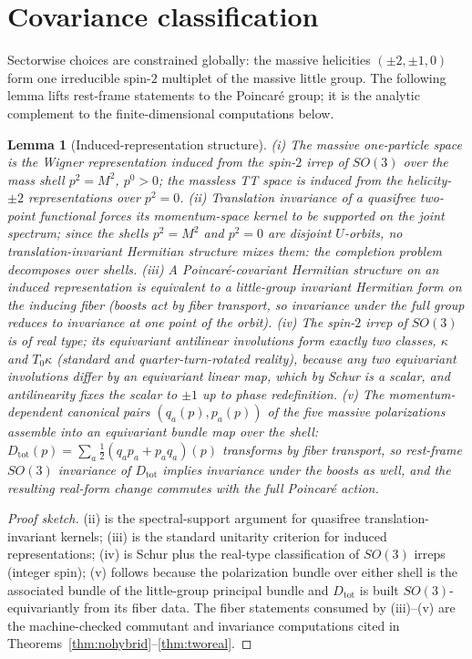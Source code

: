 \documentclass[11pt]{article}
\newtheorem{lemma}[theorem]{Lemma}
\theoremstyle{definition}
\theoremstyle{remark}
\begin{document}
\section{Covariance classification}\label{sec:covariance}

Sectorwise choices are constrained globally: the massive helicities
$(\pm2,\pm1,0)$ form one irreducible spin-$2$ multiplet of the massive
little group.  The following lemma lifts rest-frame statements to the
Poincar\'e group; it is the analytic complement to the finite-dimensional
computations below.

\begin{lemma}[Induced-representation structure]\label{lem:wigner}
(i) The massive one-particle space is the Wigner representation induced
from the spin-$2$ irrep of $SO(3)$ over the mass shell
$p^2=M^2$, $p^0>0$; the massless TT space is induced from the
helicity-$\pm2$ representations over $p^2=0$.
(ii) Translation invariance of a quasifree two-point functional forces
its momentum-space kernel to be supported on the joint spectrum; since
the shells $p^2=M^2$ and $p^2=0$ are disjoint $U$-orbits, no
translation-invariant Hermitian structure mixes them: the completion
problem decomposes over shells.
(iii) A Poincar\'e-covariant Hermitian structure on an induced
representation is equivalent to a little-group invariant Hermitian form
on the inducing fiber (boosts act by fiber transport, so invariance under
the full group reduces to invariance at one point of the orbit).
(iv) The spin-$2$ irrep of $SO(3)$ is of real type; its equivariant
antilinear involutions form exactly two classes, $\kappa$ and
$T_0\kappa$ (standard and quarter-turn-rotated reality), because any two
equivariant involutions differ by an equivariant linear map, which by
Schur is a scalar, and antilinearity fixes the scalar to $\pm1$ up to
phase redefinition.
(v) The momentum-dependent canonical pairs $(q_a(p),p_a(p))$ of the five
massive polarizations assemble into an equivariant bundle map over the
shell: $D_{\mathrm{tot}}(p)=\sum_a\tfrac12(q_ap_a+p_aq_a)(p)$ transforms
by fiber transport, so rest-frame $SO(3)$ invariance of
$D_{\mathrm{tot}}$ implies invariance under the boosts as well, and the
resulting real-form change commutes with the full Poincar\'e action.
\end{lemma}

\begin{proof}[Proof sketch]
(ii) is the spectral-support argument for quasifree translation-invariant
kernels; (iii) is the standard unitarity criterion for induced
representations; (iv) is Schur plus the real-type classification of
$SO(3)$ irreps (integer spin); (v) follows because the polarization
bundle over either shell is the associated bundle of the little-group
principal bundle and $D_{\mathrm{tot}}$ is built $SO(3)$-equivariantly
from its fiber data.  The fiber statements consumed by (iii)--(v) are the
machine-checked commutant and invariance computations cited in
Theorems~\ref{thm:nohybrid}--\ref{thm:tworeal}.
\end{proof}
\end{document}
